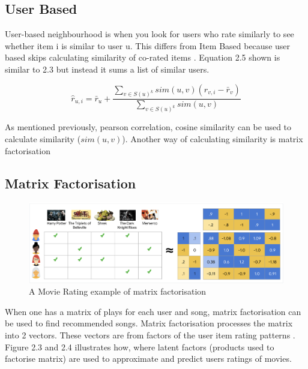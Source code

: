 \subsection{User Based}

User-based neighbourhood is when you look for users who rate similarly to see whether item i is similar to user u. This differs from Item Based because user based skips calculating similarity of co-rated items \citep{pinela_recommender_2017}. Equation 2.5 shown is similar to 2.3 but instead it sums a list of similar users.

\begin{equation}
	\hat{r} _{u,i} = \bar{r}_{u} + \frac{ \sum _{v \in S(u)^{k}} sim(u ,v) ( r_{v, i} - \bar{r}_{v})}{\sum _{v \in S(u)^{k}} sim(u , v)}
\end{equation}

As mentioned previously, pearson correlation, cosine similarity can be used to calculate similarity ($sim(u ,v)$). Another way of calculating similarity is matrix factorisation

\subsection{Matrix Factorisation}

\begin{figure}[H]
	\includegraphics[scale=0.45]{images/matrix_factorisation_example}
	\centering
	\caption{A Movie Rating example of matrix factorisation  \citep{httpsdevelopersgooglecom_matrix_2023}} 
	\label{fig:figure}
\end{figure}

When one has a matrix of plays for each user and song, matrix factorisation can be used to find recommended songs. Matrix factorisation processes the matrix into 2 vectors. These vectors are from factors of the user item rating patterns \citep{koren_matrix_2009}. Figure 2.3 and 2.4 illustrates how, where latent factors (products used to factorise matrix) are used to approximate and predict users ratings of movies. 


